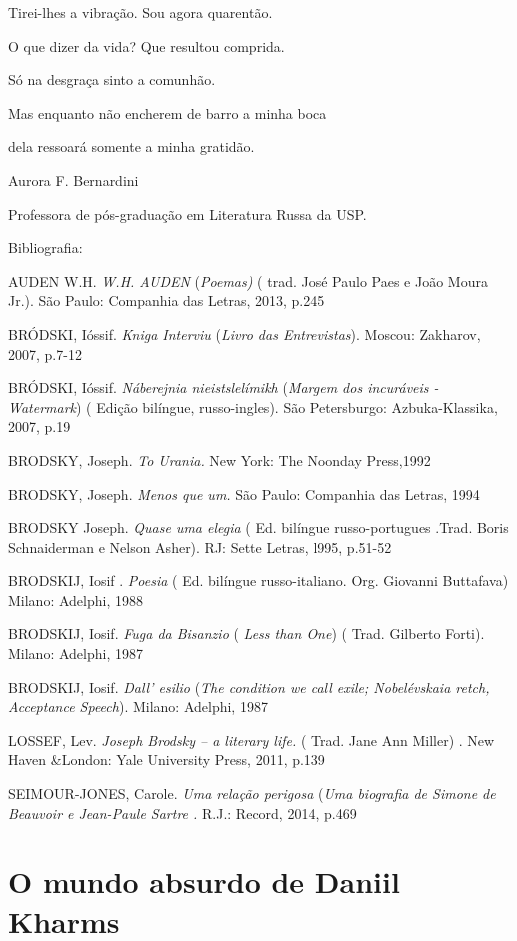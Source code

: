 Tirei-lhes a vibração. Sou agora quarentão.

O que dizer da vida? Que resultou comprida.

Só na desgraça sinto a comunhão.

Mas enquanto não encherem de barro a minha boca

dela ressoará somente a minha gratidão.

Aurora F. Bernardini

Professora de pós-graduação em Literatura Russa da USP.

Bibliografia:

AUDEN W.H. \emph{W.H. AUDEN} (\emph{Poemas)} ( trad. José Paulo Paes e
João Moura Jr.). São Paulo: Companhia das Letras, 2013, p.245

BRÓDSKI, Ióssif. \emph{Kniga Interviu} (\emph{Livro das Entrevistas}).
Moscou: Zakharov, 2007, p.7-12

BRÓDSKI, Ióssif. \emph{Náberejnia nieistslelímikh} (\emph{Margem dos
incuráveis - Watermark}) ( Edição bilíngue, russo-ingles). São
Petersburgo: Azbuka-Klassika, 2007, p.19

BRODSKY, Joseph. \emph{To Urania.} New York: The Noonday Press,1992

BRODSKY, Joseph. \emph{Menos que um.} São Paulo: Companhia das Letras,
1994

BRODSKY Joseph. \emph{Quase uma elegia} ( Ed. bilíngue russo-portugues
.Trad. Boris Schnaiderman e Nelson Asher). RJ: Sette Letras, l995,
p.51-52

BRODSKIJ, Iosif . \emph{Poesia} ( Ed. bilíngue russo-italiano. Org.
Giovanni Buttafava) Milano: Adelphi, 1988

BRODSKIJ, Iosif. \emph{Fuga da Bisanzio} ( \emph{Less than One}) ( Trad.
Gilberto Forti). Milano: Adelphi, 1987

BRODSKIJ, Iosif. \emph{Dall' esilio} (\emph{The condition we call exile;
Nobelévskaia retch, Acceptance Speech}). Milano: Adelphi, 1987

LOSSEF, Lev. \emph{Joseph Brodsky -- a literary life.} ( Trad. Jane Ann
Miller) . New Haven \&London: Yale University Press, 2011, p.139

SEIMOUR-JONES, Carole. \emph{Uma relação perigosa} (\emph{Uma biografia
de Simone de Beauvoir e Jean-Paule Sartre .} R.J.: Record, 2014, p.469

\chapter{O mundo absurdo de Daniil Kharms}

